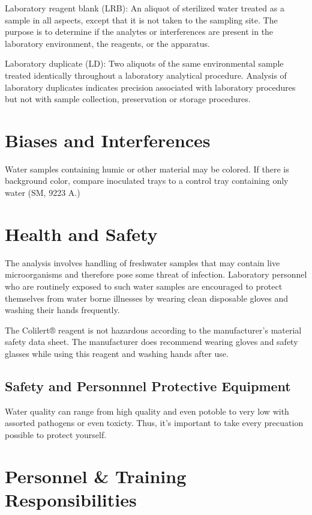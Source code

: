 \documentclass[12pt]{../SOP4_alpha}\usepackage[]{graphicx}\usepackage[]{color}
\begin{document}
\NP Laboratory reagent blank (LRB): An aliquot of sterilized water treated as a
sample in all aspects, except that it is not taken to the sampling site. The
purpose is to determine if the analytes or interferences are present in the
laboratory environment, the reagents, or the apparatus.

\NP Laboratory duplicate (LD): Two aliquots of the same environmental sample
treated identically throughout a laboratory analytical procedure. Analysis
of laboratory duplicates indicates precision associated with laboratory
procedures but not with sample collection, preservation or storage
procedures. 


\section{Biases and Interferences}

\NP Water samples containing humic or other material may be colored. If there is
background color, compare inoculated trays to a control tray containing only
water (SM, 9223 A.) 

\section{Health and Safety}

\NP The analysis involves handling of freshwater samples that may contain live
microorganisms and therefore pose some threat of infection. Laboratory personnel
who are routinely exposed to such water samples are encouraged to protect
themselves from water borne illnesses by wearing clean disposable gloves and
washing their hands frequently.

\NP The Colilert® reagent is not hazardous according to the manufacturer’s material
safety data sheet. The manufacturer does recommend wearing gloves and safety
glasses while using this reagent and washing hands after use. 


\subsection{Safety and Personnnel Protective Equipment}

Water quality can range from high quality and even potoble to very low with assorted pathogens or even toxicty. Thus, it's important to take every precuation possible to protect yourself. 

\section{Personnel \& Training Responsibilities}
\end{document}
